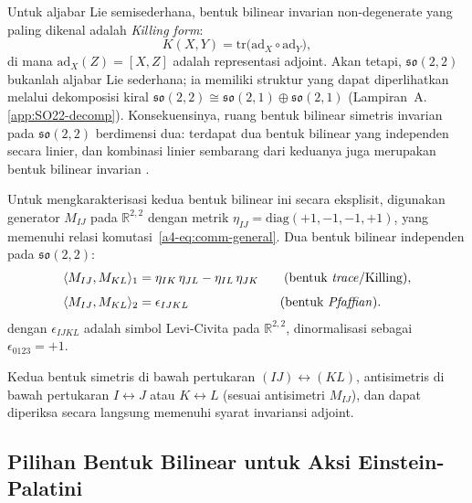 Untuk aljabar Lie semisederhana, bentuk bilinear invarian non-degenerate yang paling dikenal adalah \textit{Killing form}:
\begin{equation}\label{abf-eq:killing}
    K(X, Y) = \mathrm{tr}\!\big(\mathrm{ad}_X \circ \mathrm{ad}_Y\big),
\end{equation}
di mana $\mathrm{ad}_X(Z) = [X, Z]$ adalah representasi adjoint. Akan tetapi, $\mathfrak{so}(2,2)$ bukanlah aljabar Lie sederhana; ia memiliki struktur yang dapat diperlihatkan melalui dekomposisi kiral $\mathfrak{so}(2,2) \cong \mathfrak{so}(2,1) \oplus \mathfrak{so}(2,1)$ (Lampiran~A.\ref{app:SO22-decomp}). Konsekuensinya, ruang bentuk bilinear simetris invarian pada $\mathfrak{so}(2,2)$ berdimensi dua: terdapat dua bentuk bilinear yang independen secara linier, dan kombinasi linier sembarang dari keduanya juga merupakan bentuk bilinear invarian \cite{witten1988, achucarro1986}.

Untuk mengkarakterisasi kedua bentuk bilinear ini secara eksplisit, digunakan generator $M_{IJ}$ pada $\mathbb{R}^{2,2}$ dengan metrik $\eta_{IJ} = \mathrm{diag}(+1,-1,-1,+1)$, yang memenuhi relasi komutasi~\eqref{a4-eq:comm-general}. Dua bentuk bilinear independen pada $\mathfrak{so}(2,2)$:
\begin{align}
    \langle M_{IJ}, M_{KL}\rangle_1 &= \eta_{IK}\,\eta_{JL} - \eta_{IL}\,\eta_{JK} \qquad \text{(bentuk \textit{trace}/Killing)}, \label{abf-eq:bilinear-1}\\[4pt]
    \langle M_{IJ}, M_{KL}\rangle_2 &= \epsilon_{IJKL} \qquad\qquad\qquad\quad\,\text{(bentuk \textit{Pfaffian})}. \label{abf-eq:bilinear-2}
\end{align}
dengan $\epsilon_{IJKL}$ adalah simbol Levi-Civita pada $\mathbb{R}^{2,2}$, dinormalisasi sebagai $\epsilon_{0123} = +1$.

Kedua bentuk simetris di bawah pertukaran $(IJ) \leftrightarrow (KL)$, antisimetris di bawah pertukaran $I \leftrightarrow J$ atau $K \leftrightarrow L$ (sesuai antisimetri $M_{IJ}$), dan dapat diperiksa secara langsung memenuhi syarat invariansi adjoint.

\subsection{Pilihan Bentuk Bilinear untuk Aksi Einstein-Palatini}
\label{app:bilinear-choice}

